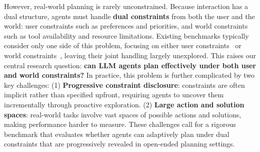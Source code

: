 \documentclass{llmxive}
\begin{document}
However, real-world planning is rarely unconstrained. Because interaction has a dual structure, agents must handle \textbf{dual constraints} from both the user and the world: user constraints such as preferences and priorities, and world constraints such as tool availability and resource limitations.
Existing benchmarks typically consider only one side of this problem, focusing on either user constraints~\citep{UserBench,opentom,URS-dataset} or world constraints~\citep{appworld,tau-2-bench,PlanBench}, leaving their joint handling largely unexplored.
This raises our central research question: \textbf{can LLM agents plan effectively under both user and world constraints?} 
In practice, this problem is further complicated by two key challenges:
(1) \textbf{Progressive constraint disclosure}: constraints are often implicit rather than specified upfront, requiring agents to uncover them incrementally through proactive exploration.
(2) \textbf{Large action and solution spaces}: real-world tasks involve vast spaces of possible actions and solutions, making performance harder to measure. %
These challenges call for a rigorous benchmark that evaluates whether agents can adaptively plan under dual constraints that are progressively revealed in open-ended planning settings.
\end{document}
